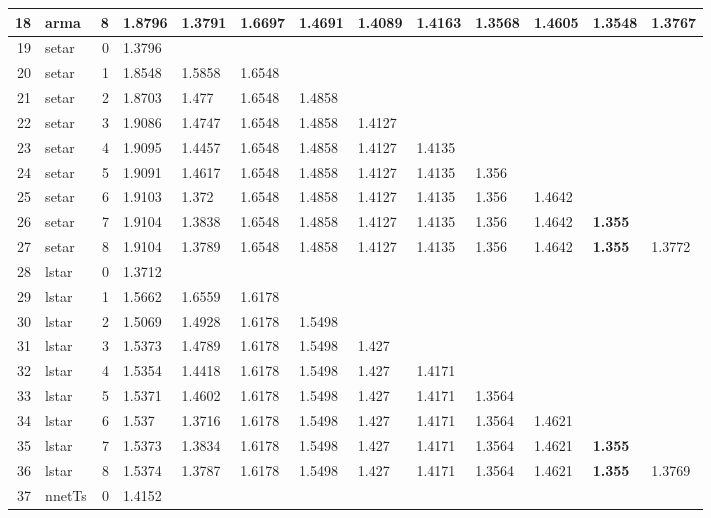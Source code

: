 \documentclass[10pt,a4paper]{article}
\begin{document}
\begin{table}[ht]
\begin{tabular}{rlrllllllllll}
  18 & arma &     8 & 1.8796 & 1.3791 & 1.6697 & 1.4691 & 1.4089 & 1.4163 & 1.3568 & 1.4605 & 1.3548 & 1.3767 \\ 
   \hline
19 & setar &     0 & 1.3796 &  &  &  &  &  &  &  &  &  \\ 
  20 & setar &     1 & 1.8548 & 1.5858 & 1.6548 &  &  &  &  &  &  &  \\ 
  21 & setar &     2 & 1.8703 & 1.477 & 1.6548 & 1.4858 &  &  &  &  &  &  \\ 
  22 & setar &     3 & 1.9086 & 1.4747 & 1.6548 & 1.4858 & 1.4127 &  &  &  &  &  \\ 
  23 & setar &     4 & 1.9095 & 1.4457 & 1.6548 & 1.4858 & 1.4127 & 1.4135 &  &  &  &  \\ 
  24 & setar &     5 & 1.9091 & 1.4617 & 1.6548 & 1.4858 & 1.4127 & 1.4135 & 1.356 &  &  &  \\ 
  25 & setar &     6 & 1.9103 & 1.372 & 1.6548 & 1.4858 & 1.4127 & 1.4135 & 1.356 & 1.4642 &  &  \\ 
  26 & setar &     7 & 1.9104 & 1.3838 & 1.6548 & 1.4858 & 1.4127 & 1.4135 & 1.356 & 1.4642 & \textbf{1.355} &  \\ 
  27 & setar &     8 & 1.9104 & 1.3789 & 1.6548 & 1.4858 & 1.4127 & 1.4135 & 1.356 & 1.4642 & \textbf{1.355} & 1.3772 \\ 
   \hline
28 & lstar &     0 & 1.3712 &  &  &  &  &  &  &  &  &  \\ 
  29 & lstar &     1 & 1.5662 & 1.6559 & 1.6178 &  &  &  &  &  &  &  \\ 
  30 & lstar &     2 & 1.5069 & 1.4928 & 1.6178 & 1.5498 &  &  &  &  &  &  \\ 
  31 & lstar &     3 & 1.5373 & 1.4789 & 1.6178 & 1.5498 & 1.427 &  &  &  &  &  \\ 
  32 & lstar &     4 & 1.5354 & 1.4418 & 1.6178 & 1.5498 & 1.427 & 1.4171 &  &  &  &  \\ 
  33 & lstar &     5 & 1.5371 & 1.4602 & 1.6178 & 1.5498 & 1.427 & 1.4171 & 1.3564 &  &  &  \\ 
  34 & lstar &     6 & 1.537 & 1.3716 & 1.6178 & 1.5498 & 1.427 & 1.4171 & 1.3564 & 1.4621 &  &  \\ 
  35 & lstar &     7 & 1.5373 & 1.3834 & 1.6178 & 1.5498 & 1.427 & 1.4171 & 1.3564 & 1.4621 & \textbf{1.355} &  \\ 
  36 & lstar &     8 & 1.5374 & 1.3787 & 1.6178 & 1.5498 & 1.427 & 1.4171 & 1.3564 & 1.4621 & \textbf{1.355} & 1.3769 \\ 
   \hline
37 & nnetTs &     0 & 1.4152 &  &  &  &  &  &  &  &  &  \\ 

\end{tabular}
\end{table}
\end{document}
